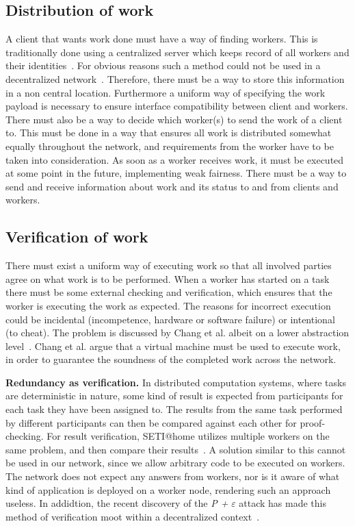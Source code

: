 \subsection{Distribution of work}
\label{sec:prob:distribution}
A client that wants work done must have a way of finding workers. This is traditionally done using a centralized server which keeps record of all workers and their identities~\cite{anderson:2005}\cite{sarmenta:2002}. For obvious reasons such a method could not be used in a decentralized network~\cite{baran}. Therefore, there must be a way to store this information in a non central location. Furthermore a uniform way of specifying the work payload is necessary to ensure interface compatibility between client and workers. There must also be a way to decide which worker(s) to send the work of a client to. This must be done in a way that ensures all work is distributed somewhat equally throughout the network, and requirements from the worker have to be taken into consideration. As soon as a worker receives work, it must be executed at some point in the future, implementing weak fairness. There must be a way to send and receive information about work and its status to and from clients and workers.

\subsection{Verification of work}
\label{sec:prob:verification}
There must exist a uniform way of executing work so that all involved parties agree on what work is to be performed. When a worker has started on a task there must be some external checking and verification, which ensures that the worker is executing the work as expected. The reasons for incorrect execution could be incidental (incompetence, hardware or software failure) or intentional (to cheat). The problem is discussed by Chang et al. albeit on a lower abstraction level~\cite{chang:2002}. Chang et al. argue that a virtual machine must be used to execute work, in order to guarantee the soundness of the completed work across the network.

\textbf{Redundancy as verification.} In distributed computation systems, where tasks are deterministic in nature, some kind of result is expected from participants for each task they have been assigned to. The results from the same task performed by different participants can then be compared against each other for proof-checking. For result verification, SETI@home utilizes multiple workers on the same problem, and then compare their results~\cite{korpela:2001}. A solution similar to this cannot be used in our network, since we allow arbitrary code to be executed on workers. The network does not expect any answers from workers, nor is it aware of what kind of application is deployed on a worker node, rendering such an approach useless. In addidtion, the recent discovery of the \emph{P +} $\varepsilon$ attack has made this method of verification moot within a decentralized context~\cite{buterin:2015}.

